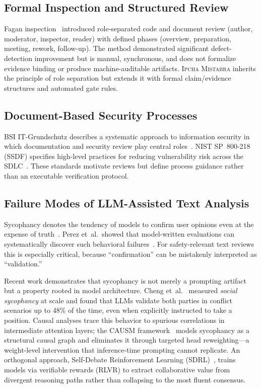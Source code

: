 \documentclass[11pt,a4paper]{article}
\newcommand{\methodname}{\textsc{Ipcha Mistabra}}
\begin{document}
\subsection{Formal Inspection and Structured Review}
Fagan inspection~\cite{fagan1976} introduced role-separated code and document review (author, moderator, inspector, reader) with defined phases (overview, preparation, meeting, rework, follow-up).
The method demonstrated significant defect-detection improvement but is manual, synchronous, and does not formalize evidence binding or produce machine-auditable artifacts.
\methodname{} inherits the principle of role separation but extends it with formal claim/evidence structures and automated gate rules.

\subsection{Document-Based Security Processes}
BSI IT-Grundschutz describes a systematic approach to information security in which documentation and security review play central roles~\cite{bsi_standard_100_2}.
NIST SP~800-218 (SSDF) specifies high-level practices for reducing vulnerability risk across the SDLC~\cite{nist_sp800_218}.
These standards motivate reviews but define process guidance rather than an executable verification protocol.

\subsection{Failure Modes of LLM-Assisted Text Analysis}
\label{sec:sycophancy}
Sycophancy denotes the tendency of models to confirm user opinions even at the expense of truth~\cite{sharma_sycophancy}.
Perez et~al.\ showed that model-written evaluations can systematically discover such behavioral failures~\cite{perez2023}.
For safety-relevant text reviews this is especially critical, because ``confirmation'' can be mistakenly interpreted as ``validation.''

Recent work demonstrates that sycophancy is not merely a prompting artifact but a property rooted in model architecture.
Cheng et~al.~\cite{cheng2026} measured \emph{social sycophancy} at scale and found that LLMs validate both parties in conflict scenarios up to 48\% of the time, even when explicitly instructed to take a position.
Causal analyses trace this behavior to spurious correlations in intermediate attention layers; the CAUSM framework~\cite{causm2025} models sycophancy as a structural causal graph and eliminates it through targeted head reweighting---a weight-level intervention that inference-time prompting cannot replicate.
An orthogonal approach, Self-Debate Reinforcement Learning (SDRL)~\cite{sdrl2025}, trains models via verifiable rewards (RLVR) to extract collaborative value from divergent reasoning paths rather than collapsing to the most fluent consensus.
\end{document}
